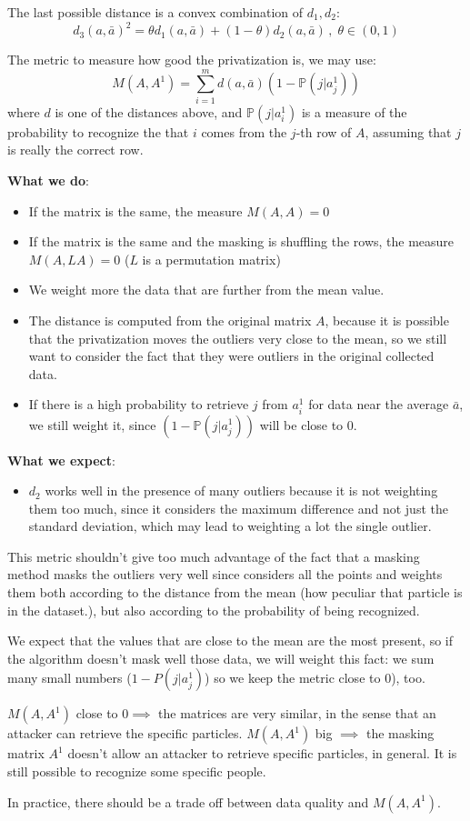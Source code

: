 \documentclass{article}
\renewcommand{\P}{\mathbb{P}}
\begin{document}
The last possible distance is a convex combination of $d_1, d_2$:
\begin{equation}
	d_3(a, \bar{a})^2 = \theta d_1(a, \bar{a}) + (1 - \theta) d_2(a, \bar{a}) \, , \; \theta \in (0, 1)
\end{equation}

The metric to measure how good the privatization is, we may use:
\begin{equation}
	M(A, A^1) = \sum_{i=1}^{m} d(a, \bar{a}) (1 - \P(j| a_j^1) )
\end{equation}
where $d$ is one of the distances above, and $\P(j | a_i^1)$ is a measure of the probability to recognize the that $i$ comes from the $j$-th row of $A$, assuming that $j$ is really the correct row. 

\textbf{What we do}:
\begin{itemize}
	\item If the matrix is the same, the measure $M(A, A) = 0$
	\item If the matrix is the same and the masking is shuffling the rows, the measure $M(A, LA) = 0$ ($L$ is a permutation matrix)
	\item We weight more the data that are further from the mean value.
	\item The distance is computed from the original matrix $A$, because it is possible that the privatization moves the outliers very close to the mean, so we still want to consider the fact that they were outliers in the original collected data.
	\item If there is a high probability to retrieve $j$ from $a_i^1$ for data near the average $\bar{a}$, we still weight it, since $(1 - \P(j| a_j^1) )$ will be close to $0$.
\end{itemize}
\textbf{What we expect}:
\begin{itemize}
	\item $d_2$ works well in the presence of many outliers because it is not weighting them too much, since it considers the maximum difference and not just the standard deviation, which may lead to weighting a lot the single outlier.
\end{itemize}

This metric shouldn't give too much advantage of the fact that a masking method masks the outliers very well since considers all the points and weights them both according to the distance from the mean (how peculiar that particle is in the dataset.), but also according to the probability of being recognized.

We expect that the values that are close to the mean are the most present, so if the algorithm doesn't mask well those data, we will weight this fact: we sum many small numbers ($1-P(j| a_j^1)$) so we keep the metric close to $0$), too.

$M(A,A^1)$ close to $0 \implies $ the matrices are very similar, in the sense that an attacker can retrieve the specific particles. $M(A,A^1)$ big $\implies$ the masking matrix $A^1$ doesn't allow an attacker to retrieve specific particles, in general. It is still possible to recognize some specific people.

In practice, there should be a trade off between data quality and $M(A,A^1)$.
\end{document}
